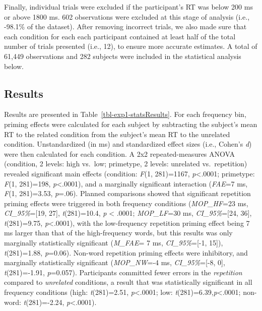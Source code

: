 \documentclass[
]{interact}
\begin{document}
Finally, individual trials were excluded if the participant's RT was
below 200 ms or above 1800 ms. 602 observations were excluded at this
stage of analysis (i.e., -98.1\% of the dataset). After removing
incorrect trials, we also made sure that each condition for each each
participant contained at least half of the total number of trials
presented (i.e., 12), to ensure more accurate estimates. A total of
61,449 observations and 282 subjects were included in the statistical
analysis below.

\subsection{Results}\label{sec-exp1-results}

Results are presented in Table~\ref{tbl-exp1-statsResults}. For each
frequency bin, priming effects were calculated for each subject by
subtracting the subject's mean RT to the related condition from the
subject's mean RT to the unrelated condition. Unstandardized (in ms) and
standardized effect sizes (i.e., Cohen's \emph{d}) were then calculated
for each condition. A 2x2 repeated-measures ANOVA (condition, 2 levels:
high vs.~low; primetype, 2 levels: unrelated vs.~repetition) revealed
significant main effects (condition: \emph{F}(1, 281)=1167,
\emph{p}\textless.0001; primetype: \emph{F}(1, 281)=198,
\emph{p}\textless.0001), and a marginally significant interaction
(\emph{FAE}=7 ms, \emph{F}(1, 281)=3.53, \emph{p}=.06). Planned
comparisons showed that significant repetition priming effects were
triggered in both frequency conditions (\emph{MOP\_HF}=23 ms,
\emph{CI\_95\%}={[}19, 27{]}, \emph{t}(281)=10.4, \emph{p} \textless{}
.0001; \emph{MOP\_LF}=30 ms, \emph{CI\_95\%}={[}24, 36{]},
\emph{t}(281)=9.75, \emph{p}\textless.0001), with the low-frequency
repetition priming effect being 7 ms larger than that of the
high-frequency words, but this results was only marginally statistically
significant (\emph{M\_FAE}= 7 ms, \emph{CI\_95\%}={[}-1, 15{]}),
\emph{t}(281)=1.88, \emph{p}=0.06). Non-word repetition priming effects
were inhibitory, and marginally statistically significant
(\emph{MOP\_NW}=-4 ms, \emph{CI\_95\%}={[}-8, 0{]}, \emph{t}(281)=-1.91,
\emph{p}=0.057). Participants committed fewer errors in the
\emph{repetition} compared to \emph{unrelated} conditions, a result that
was statistically significant in all frequency conditions (high:
\emph{t}(281)=2.51, \emph{p}\textless.0001; low:
\emph{t}(281)=6.39,\emph{p}\textless.0001; non-word:
\emph{t}(281)=-2.24, \emph{p}\textless.0001).
\end{document}
